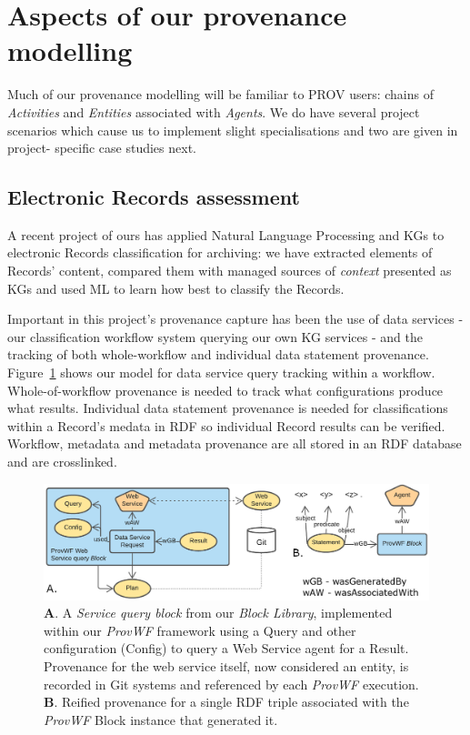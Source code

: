 \documentclass[letterpaper,twocolumn,10pt]{article}
\begin{document}
\section{Aspects of our provenance modelling}
Much of our provenance modelling will be familiar to PROV users: chains of \textit{Activities} and \textit{Entities} associated with 
\textit{Agents}. We do have several project scenarios which cause us to implement slight specialisations and two are given in project-
specific case studies next.

\subsection{Electronic Records assessment}
A recent project of ours has applied Natural Language Processing and KGs to electronic Records classification for archiving: we have extracted elements of Records' content, compared them with managed sources of \textit{context} presented as KGs and used ML to learn
how best to classify the Records.

Important in this project's provenance capture has been the use of data services - our classification workflow system querying our own
KG services - and the tracking of both whole-workflow and individual data statement provenance. Figure~\ref{fig:reified-graph-data} shows our model for data service query tracking within a workflow. Whole-of-workflow provenance is needed to track what configurations produce what results. Individual data statement provenance is needed for classifications within a Record's medata in RDF so individual Record results can be verified. Workflow, metadata and metadata provenance are all stored in an RDF database and are crosslinked.

\begin{figure}
  \begin{center}
    \includegraphics[width=\textwidth]{images/ds-reified.png}
  \end{center}
  \caption{\label{fig:reified-graph-data} \textbf{A}. A \textit{Service query block} from our \textit{Block Library}, implemented within our \textit{ProvWF} framework using a Query and other configuration (Config) to query a Web Service agent for a Result. Provenance for the web service itself, now considered an entity, is recorded in Git systems and referenced by each \textit{ProvWF} execution. \textbf{B}. Reified provenance for a single RDF triple associated with the \textit{ProvWF} Block instance that generated it.}
  \end{figure}
\end{document}
